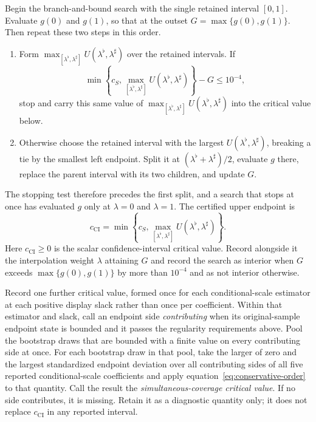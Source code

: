 \documentclass[11pt]{article}
\begin{document}
Begin the branch-and-bound search with the single retained interval \([0,1]\). Evaluate \(g(0)\) and \(g(1)\), so that at the
outset \(G=\max\{g(0),g(1)\}\). Then repeat these two steps in this order.
\begin{enumerate}
\item Form \(\max_{[\lambda^{\flat},\lambda^{\sharp}]}U(\lambda^{\flat},\lambda^{\sharp})\) over the retained intervals. If
\begin{equation*}
 \min\left\{c_S,\max_{[\lambda^{\flat},\lambda^{\sharp}]}U(\lambda^{\flat},\lambda^{\sharp})\right\}-G\le10^{-4},
\end{equation*}
stop and carry this same value of \(\max_{[\lambda^{\flat},\lambda^{\sharp}]}U(\lambda^{\flat},\lambda^{\sharp})\) into the critical value below.
\item Otherwise choose the retained interval with the largest \(U(\lambda^{\flat},\lambda^{\sharp})\), breaking a tie by the
smallest left endpoint. Split it at \((\lambda^{\flat}+\lambda^{\sharp})/2\), evaluate \(g\) there, replace the parent interval
with its two children, and update \(G\).
\end{enumerate}
The stopping test therefore precedes the first split, and a search that stops at once has evaluated
\(g\) only at \(\lambda=0\) and \(\lambda=1\). The certified upper endpoint is
\begin{equation*}
 c_{\mathrm{CI}}=\min\left\{c_S,\max_{[\lambda^{\flat},\lambda^{\sharp}]}U(\lambda^{\flat},\lambda^{\sharp})\right\}.
\end{equation*}
Here \(c_{\mathrm{CI}}\ge0\) is the scalar confidence-interval critical value. Record alongside it
the interpolation weight \(\lambda\) attaining \(G\) and record the search as interior when
\(G\) exceeds \(\max\{g(0),g(1)\}\) by more than \(10^{-4}\) and as not interior otherwise.

Record one further critical value, formed once for each conditional-scale estimator at each positive
display slack rather than once per coefficient. Within that estimator and slack, call an endpoint
side \emph{contributing} when its original-sample endpoint state is bounded and it passes the
regularity requirements above. Pool the bootstrap draws that are bounded with a finite value on every
contributing side at once. For each bootstrap draw in that pool, take the larger of zero and the
largest standardized endpoint deviation over all contributing sides of all five reported
conditional-scale coefficients and apply equation~\eqref{eq:conservative-order} to that quantity. Call the result the
\emph{simultaneous-coverage critical value}. If no side contributes, it is missing. Retain it as a
diagnostic quantity only; it does not replace \(c_{\mathrm{CI}}\) in any reported interval.
\end{document}
